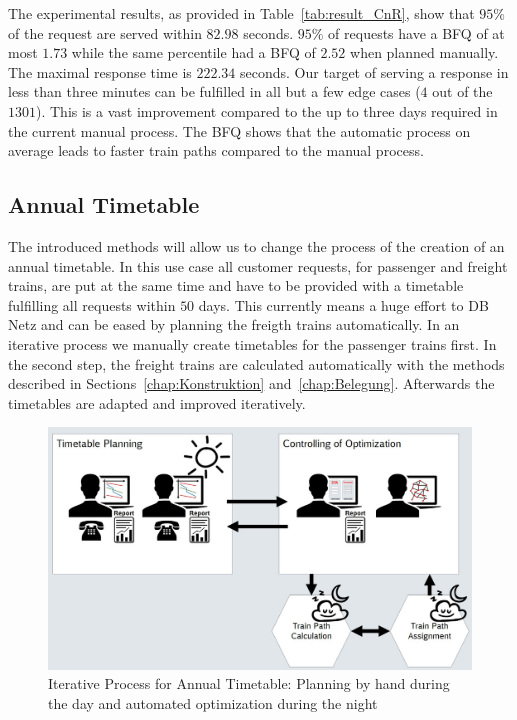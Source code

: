 The experimental results, as provided in Table~\ref{tab:result_CnR}, show that $95\%$ of the request are served within $82.98$ seconds. $95\%$ of requests have a BFQ of at most $1.73$ while the same percentile had a BFQ of $2.52$ when planned manually. The maximal response time is $222.34$ seconds. Our target of serving a response in less than three minutes can be fulfilled in all but a few edge cases ($4$ out of the $1301$). This is a vast improvement compared to the up to three days required in the current manual process. The BFQ shows that the automatic process on average leads to faster train paths compared to the manual process.

\subsection{Annual Timetable}
\label{chap:Netzfahrplan}

The introduced methods will allow us to change the process of the creation of an annual timetable. In this use case all customer requests, for passenger and freight trains, are put at the same time and have to be provided with a timetable fulfilling all requests within $50$ days. This currently means a huge effort to DB Netz and can be eased by planning the freigth trains automatically. In an iterative process we manually create timetables for the passenger trains first. In the second step, the freight trains are calculated automatically with the methods described in Sections~\ref{chap:Konstruktion} and~\ref{chap:Belegung}. Afterwards the timetables are adapted and improved iteratively.

\begin{figure}[htb]
	\centering
	\includegraphics[width=\textwidth]{Bilder/annual_planning.jpg}
	\caption{Iterative Process for Annual Timetable: Planning by hand during the day and automated optimization during the night}
	\label{fig:annual_planning}
\end{figure}

